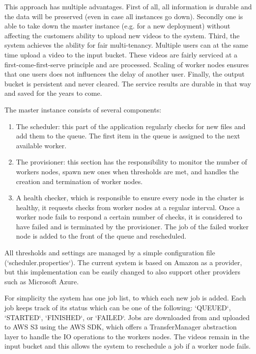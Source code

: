 \documentclass[a4paper]{IEEEtran}
\begin{document}
This approach has multiple advantages.
First of all, all information is durable and the data will be preserved (even in case all instances go down).
Secondly one is able to take down the master instance (e.g. for a new deployment) without affecting the customers ability to upload new videos to the system.
Third, the system achieves the ability for fair multi-tenancy.
Multiple users can at the same time upload a video to the input bucket.
These videos are fairly serviced at a first-come-first-serve principle
and are processed.
Scaling of worker nodes ensures that one users does not influences the delay of another user.
Finally, the output bucket is persistent and never cleared.
The service results are durable in that way and saved for the years to come.

The master instance consists of several components:

\begin{enumerate}
\item
The scheduler:
this part of the application regularly checks for new files and add them to the queue.
The first item in the queue is assigned to the next available worker.
\item
The provisioner:
this section has the responsibility to monitor the number of workers nodes, spawn new ones when thresholds are met, and handles the creation and termination of worker nodes.
\item
A health checker, which is responsible to ensure every node in the cluster is healthy, it requests checks from worker nodes at a regular interval.
Once a worker node fails to respond a certain number of checks, it is considered to have failed and is terminated by the provisioner.
The job of the failed worker node is added to the front of the queue and rescheduled.
\end{enumerate}

All thresholds and settings are managed by a simple configuration file (`scheduler.properties`).
The current system is based on Amazon as a provider, but this implementation can be easily changed to also support other providers such as Microsoft Azure.

For simplicity the system has one job list, to which each new job is added.
Each job keeps track of its status which can be one of the following: `QUEUED`, `STARTED`, `FINISHED`, or `FAILED`.
Jobs are downloaded from and uploaded to AWS S3 using the AWS SDK, which offers a TransferManager abstraction layer to handle the IO operations to the workers nodes.
The videos remain in the input bucket and this allows the system to reschedule a job if a worker node fails.
\end{document}
